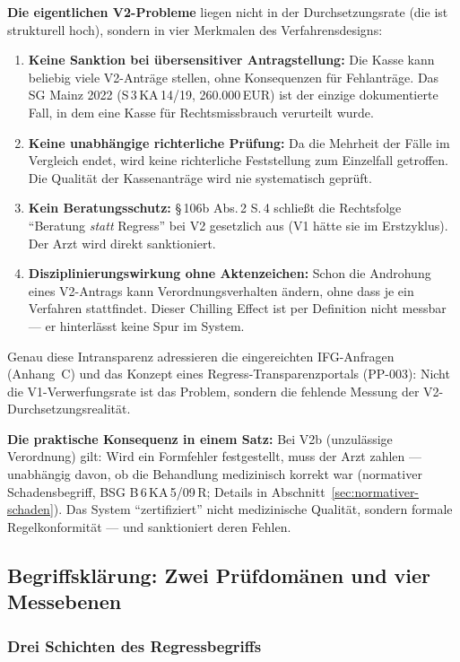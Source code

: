 \documentclass{umbruch-position}
\begin{document}
\textbf{Die eigentlichen V2-Probleme} liegen nicht in der Durchsetzungsrate (die ist strukturell hoch), sondern in vier Merkmalen des Verfahrensdesigns:

\begin{enumerate}[nosep]
  \item \textbf{Keine Sanktion bei übersensitiver Antragstellung:} Die Kasse kann beliebig viele V2-Anträge stellen, ohne Konsequenzen für Fehlanträge. Das SG Mainz 2022 (S\,3\,KA\,14/19, 260.000\,EUR) ist der einzige dokumentierte Fall, in dem eine Kasse für Rechtsmissbrauch verurteilt wurde.
  \item \textbf{Keine unabhängige richterliche Prüfung:} Da die Mehrheit der Fälle im Vergleich endet, wird keine richterliche Feststellung zum Einzelfall getroffen. Die Qualität der Kassenanträge wird nie systematisch geprüft.
  \item \textbf{Kein Beratungsschutz:} \S\,106b Abs.\,2 S.\,4 schlie\ss{}t die Rechtsfolge ``Beratung \emph{statt} Regress'' bei V2 gesetzlich aus (V1 h\"atte sie im Erstzyklus). Der Arzt wird direkt sanktioniert.
  \item \textbf{Disziplinierungswirkung ohne Aktenzeichen:} Schon die Androhung eines V2-Antrags kann Verordnungsverhalten ändern, ohne dass je ein Verfahren stattfindet. Dieser Chilling Effect ist per Definition nicht messbar --- er hinterlässt keine Spur im System.
\end{enumerate}

Genau diese Intransparenz adressieren die eingereichten IFG-Anfragen (Anhang~C) und das Konzept eines Regress-Transparenzportals (PP-003): Nicht die V1-Verwerfungsrate ist das Problem, sondern die fehlende Messung der V2-Durchsetzungsrealität.

\medskip
\noindent\textbf{Die praktische Konsequenz in einem Satz:} Bei V2b (unzulässige Verordnung) gilt: Wird ein Formfehler festgestellt, muss der Arzt zahlen --- unabhängig davon, ob die Behandlung medizinisch korrekt war (normativer Schadensbegriff, BSG B\,6\,KA\,5/09\,R; Details in Abschnitt~\ref{sec:normativer-schaden}). Das System ``zertifiziert'' nicht medizinische Qualität, sondern formale Regelkonformität --- und sanktioniert deren Fehlen.

\subsection{Begriffsklärung: Zwei Prüfdomänen und vier Messebenen}

\subsubsection*{Drei Schichten des Regressbegriffs}
\end{document}
